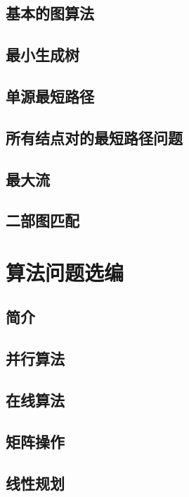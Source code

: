 \documentclass[lang=cn,newtx,10pt,scheme=chinese]{elegantbook}
\begin{document}
\chapter{基本的图算法}

\chapter{最小生成树}

\chapter{单源最短路径}

\chapter{所有结点对的最短路径问题}

\chapter{最大流}

\chapter{二部图匹配}

\part{算法问题选编}

\chapter*{简介}

\chapter{并行算法}

\chapter{在线算法}

\chapter{矩阵操作}

\chapter{线性规划}
\end{document}
